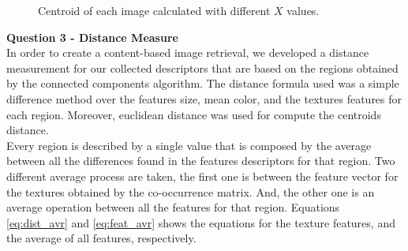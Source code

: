 \documentclass[12pt,a4paper]{article}
\begin{document}
\begin{figure}[!h]
{{		}
		\label{fig:cent10}
	}
	\quad
	\caption{Centroid of each image calculated with different $X$ values.}
	\label{fig:cent}
\end{figure}


\newpage

\textbf{\LARGE Question 3 - Distance Measure} \\

In order to create a content-based image retrieval, we developed a distance measurement for our collected descriptors that are based on the regions obtained by the connected components algorithm. The distance formula used was a simple difference method over the features size, mean color, and the textures features for each region. Moreover, euclidean distance was used for compute the centroids distance. \\

Every region is described by a single value that is composed by the average between all the differences found in the features descriptors for that region. Two different average process are taken, the first one is between the feature vector for the textures obtained by the co-occurrence matrix. And, the other one is an average operation between all the features for that region. Equations \ref{eq:dist_avr} and \ref{eq:feat_avr} shows the equations for the texture features, and the average of all features, respectively. \\
\end{document}
